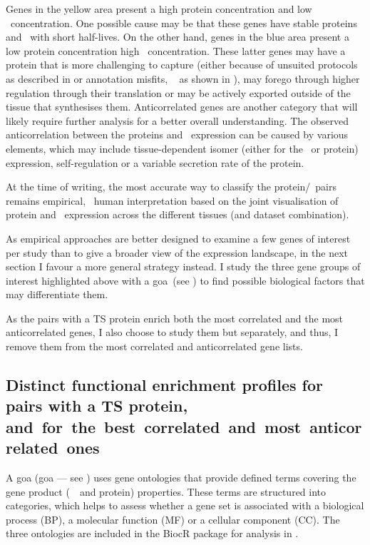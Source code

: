 Genes in the yellow area present a high protein concentration
and low \mRNA\ concentration.
One possible cause may be that these genes have stable proteins
and \mRNAs\ with short half-lives.
On the other hand,
genes in the blue area present a low protein concentration
high \mRNA\ concentration.
These latter genes may have a protein that is more challenging to capture
(either because of unsuited protocols as described in 
or annotation misfits, \eg\  as shown in ),
may forego through higher regulation through their translation
or may be actively exported outside of the tissue that synthesises them.
Anticorrelated genes are another category that will likely require
further analysis for a better overall understanding.
The observed anticorrelation between the proteins and \mRNAs\ expression
can be caused by various elements, which may include
tissue-dependent isomer (either for the \mRNA\ or protein) expression,
self-regulation or a variable secretion rate of the protein.

At the time of writing,
the most accurate way to classify the protein/\mRNA\ pairs
remains empirical,
\ie\ human interpretation based on
the joint visualisation of protein and \mRNA\ expression
across the different tissues (and dataset combination).

As empirical approaches are better designed
to examine a few genes of interest per study
than to give a broader view of the expression landscape,
in the next section I favour a more general strategy instead.
I study the three gene groups of interest highlighted above
with a \glsdesc{goa}~(see )
to find possible biological factors that may differentiate them.

As the pairs with a \gls{TS} protein enrich both the most correlated
and the most anticorrelated genes,
I also choose to study them but separately,
and thus,
I remove them from the most correlated and anticorrelated gene lists.\mybr\

\vspace{-4mm}
\subsection{Distinct functional enrichment profiles
for pairs with a TS protein,
and~for~the~best~correlated~and~most~anticorrelated~ones}
\vspace{-2mm}

A \glsdesc{goa} (\gls{goa} --- see )
uses gene ontologies that provide defined terms
covering the gene product (\ie\ \mRNA\ and protein) properties.
These terms are structured into categories,
which helps to assess whether a gene set is associated with
a biological process (BP), a molecular function (MF) or a cellular component (CC).
The three ontologies are included
in the \gls{BiocR} package 
for analysis in .

